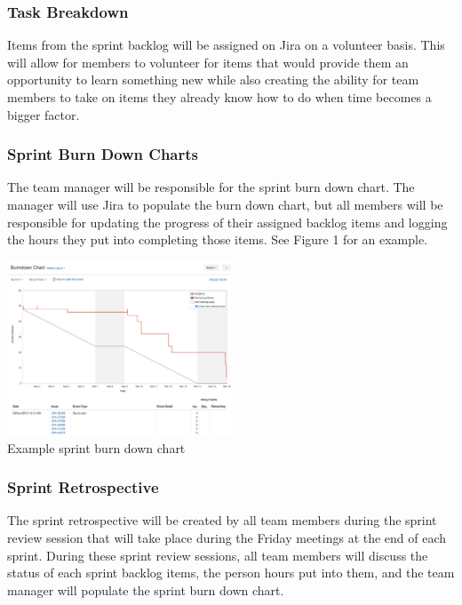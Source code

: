 \subsubsection{Task Breakdown}
Items from the sprint backlog will be assigned on Jira on a volunteer basis. This will allow for members to volunteer for items that would provide them an opportunity to learn something new while also creating the ability for team members to take on items they already know how to do when time becomes a bigger factor.

\subsubsection{Sprint Burn Down Charts}
The team manager will be responsible for the sprint burn down chart. The manager will use Jira to populate the burn down chart, but all members will be responsible for updating the progress of their assigned backlog items and logging the hours they put into completing those items. See Figure 1 for an example.

\begin{center}
    \includegraphics[width=0.5\textwidth]{images/burndown}\\
    \caption{Example sprint burn down chart}
\end{center}

\subsubsection{Sprint Retrospective}
The sprint retrospective will be created by all team members during the sprint review session that will take place during the Friday meetings at the end of each sprint. During these sprint review sessions, all team members will discuss the status of each sprint backlog items, the person hours put into them, and the team manager will populate the sprint burn down chart.

